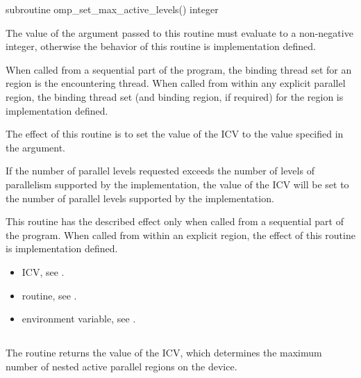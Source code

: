 \fortranspecificstart
\begin{boxedcode}
subroutine omp\_set\_max\_active\_levels()
integer 
\end{boxedcode}
\fortranspecificend

\constraints
The value of the argument passed to this routine must evaluate to a non-negative integer, 
otherwise the behavior of this routine is implementation defined.

\binding
When called from a sequential part of the program, the binding thread set for an 
 region is the encountering thread. When called 
from within any explicit parallel region, the binding thread set (and binding region, if 
required) for the  region is implementation defined. 

\effect
The effect of this routine is to set the value of the  ICV to the value 
specified in the argument. 

If the number of parallel levels requested exceeds the number of levels of parallelism 
supported by the implementation, the value of the  ICV will be set 
to the number of parallel levels supported by the implementation.

This routine has the described effect only when called from a sequential part of the 
program. When called from within an explicit  region, the effect of this 
routine is implementation defined.

\crossreferences
\begin{itemize}
\item {} ICV, see 
.

\item {} routine, see 
.

\item {} environment variable, see 
.
\end{itemize}










\subsection{}
\label{subsec:omp_get_max_active_levels}
\summary
The  routine returns the value of the 
 ICV, which determines the maximum number of nested active parallel regions 
on the device. 

